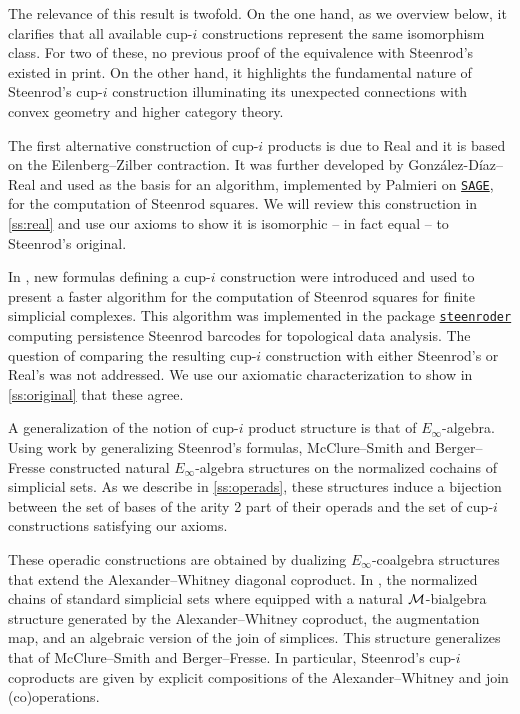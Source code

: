 The relevance of this result is twofold.
On the one hand, as we overview below, it clarifies that all available cup-$i$ constructions represent the same isomorphism class.
For two of these, no previous proof of the equivalence with Steenrod's existed in print.
On the other hand, it highlights the fundamental nature of Steenrod's \mbox{cup-$i$} construction illuminating its unexpected connections with convex geometry and higher category theory.

The first alternative construction of \mbox{cup-$i$} products is due to Real \cite{real1996computability} and it is based on the Eilenberg--Zilber contraction.
It was further developed by Gonz\'alez-D\'iaz--Real \cite{gonzalez-diaz1999steenrod} and used as the basis for an algorithm, implemented by Palmieri on \href{https://www.sagemath.org/}{\texttt{SAGE}}, for the computation of Steenrod squares.
We will review this construction in \cref{ss:real} and use our axioms to show it is isomorphic -- in fact equal -- to Steenrod's original.

In \cite{medina2021fast_sq}, new formulas defining a \mbox{cup-$i$} construction were introduced and used to present a faster algorithm for the computation of Steenrod squares for finite simplicial complexes.
This algorithm was implemented in the package \href{https://github.com/Steenroder/steenroder}{\texttt{steenroder}} computing persistence Steenrod barcodes for topological data analysis.
The question of comparing the resulting \mbox{cup-$i$} construction with either Steenrod's or Real's was not addressed.
We use our axiomatic characterization to show in \cref{ss:original} that these agree.

A generalization of the notion of \mbox{cup-$i$} product structure is that of $E_\infty$-algebra.
Using work by \cite[]{benson1998representations} generalizing Steenrod's formulas, McClure--Smith \cite{mcclure2003multivariable} and Berger--Fresse \cite{berger2004combinatorial} constructed natural $E_\infty$-algebra structures on the normalized cochains of simplicial sets.
As we describe in \cref{ss:operads}, these structures induce a bijection between the set of bases of the arity 2 part of their operads and the set of \mbox{cup-$i$} constructions satisfying our axioms.

These operadic constructions are obtained by dualizing $E_\infty$-coalgebra structures that extend the Alexander--Whitney diagonal coproduct.
In \cite{medina2020prop1}, the normalized chains of standard simplicial sets where equipped with a natural $\mathcal{M}$-bialgebra structure generated by the Alexander--Whitney coproduct, the augmentation map, and an algebraic version of the join of simplices.
This structure generalizes that of McClure--Smith and Berger--Fresse.
In particular, Steenrod's \mbox{cup-$i$} coproducts are given by explicit compositions of the Alexander--Whitney and join (co)operations.

